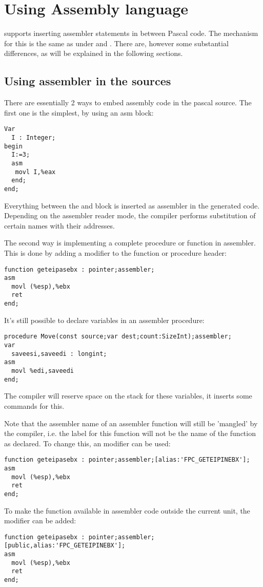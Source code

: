 \chapter{Using Assembly language}
\label{ch:AsmLang}
\fpc supports inserting assembler statements in between Pascal code. The
mechanism for this is the same as under \tp and \delphi. There are, however
some substantial differences, as will be explained in the following
sections.

\section{Using assembler in the sources}

There are essentially 2 ways to embed assembly code in the pascal source.
The first one is the simplest, by using an asm block:
\begin{verbatim}
Var
  I : Integer;
begin
  I:=3;
  asm
   movl I,%eax
  end;
end;    
\end{verbatim}
Everything between the  and  block is inserted as
assembler in the generated code. Depending on the assembler reader mode, the
compiler performs substitution of certain names with their addresses.

The second way is implementing a complete procedure or function in
assembler. This is done by adding a  modifier to the 
function or procedure header:
\begin{verbatim}
function geteipasebx : pointer;assembler;
asm
  movl (%esp),%ebx
  ret
end;
\end{verbatim}
It's still possible to declare variables in an assembler procedure:
\begin{verbatim}
procedure Move(const source;var dest;count:SizeInt);assembler;
var
  saveesi,saveedi : longint;
asm
  movl %edi,saveedi
end;
\end{verbatim}
The compiler will reserve space on the stack for these variables,
it inserts some commands for this.

Note that the assembler name of an assembler function will still be 'mangled' 
by the compiler, i.e. the label for this function will not be the name of
the function as declared. To change this, an  modifier can be
used:
\begin{verbatim}
function geteipasebx : pointer;assembler;[alias:'FPC_GETEIPINEBX'];
asm
  movl (%esp),%ebx
  ret
end;
\end{verbatim}
To make the function available in assembler code outside the current unit, 
the  modifier can be added:
\begin{verbatim}
function geteipasebx : pointer;assembler;[public,alias:'FPC_GETEIPINEBX'];
asm
  movl (%esp),%ebx
  ret
end;
\end{verbatim}

